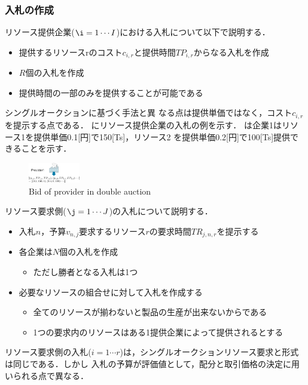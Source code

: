 \documentclass{ujarticle}
\begin{document}
\subsubsection{入札の作成}
リソース提供企業($\i=1 \cdots I$)における入札について以下で説明する．
\begin{itemize}
\item {提供するリソースrのコスト$c_{i,r}$と提供時間$TP_{i,r}$からなる入札を作成 }
\item {$R$個の入札を作成}
\item {提供時間の一部のみを提供することが可能である}
\end{itemize}
シングルオークションに基づく手法と異
なる点は提供単価ではなく，コスト$c_{i,r}$を提示する点である．
にリソース提供企業の入札の例を示す．
は企業1はリソース1を提供単価0.1[円]で150[Ts]，リソース2
を提供単価0.2[円]で100[Ts]提供できることを示す．
\begin{figure}[H]
  \centering
  \includegraphics[width=0.2\textwidth]{bid-provider-single.pdf} 
  \caption{Bid of provider in double auction}
  \label{fig:bid-provider-double}
\end{figure} 
リソース要求側($\j=1 \cdots J$)の入札について説明する．
\begin{itemize}
\item {入札$n$，予算$v_{n,j}$要求するリソース$r$の要求時間$TR_{j,n,r}$を提示する} 
\item {各企業は$N$個の入札を作成}
  \begin{itemize}
  \item {ただし勝者となる入札は1つ} 
  \end{itemize}
\item {必要なリソースの組合せに対して入札を作成する}
    \begin{itemize}
    \item {全てのリソースが揃わないと製品の生産が出来ないからである}
    \item {1つの要求内のリソースはある1提供企業によって提供されるとする}
    \end{itemize}
\end{itemize}
リソース要求側の入札($i=1 \cdots r$)は，シングルオークションリソース要求と形式は同じである．しかし
入札の予算が評価値として，配分と取引価格の決定に用いられる点で異なる．
\end{document}
